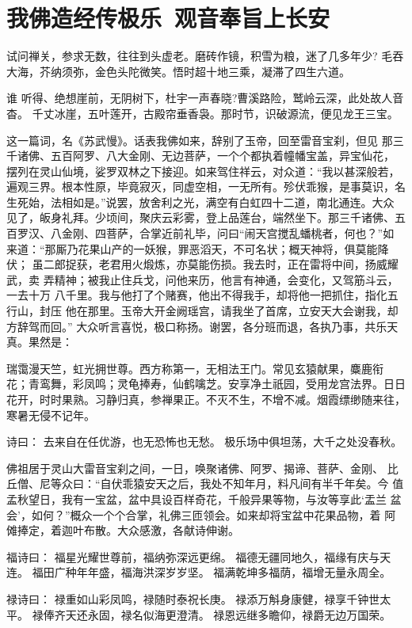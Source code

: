 \chapter{我佛造经传极乐~观音奉旨上长安}

试问禅关，参求无数，往往到头虚老。磨砖作镜，积雪为粮，迷了几多年少?
毛吞大海，芥纳须弥，金色头陀微笑。悟时超十地三乘，凝滞了四生六道。

谁
听得、绝想崖前，无阴树下，杜宇一声春晓?曹溪路险，鹫岭云深，此处故人音杳。
千丈冰崖，五叶莲开，古殿帘垂香袅。那时节，识破源流，便见龙王三宝。

这一篇词，名《苏武慢》。话表我佛如来，辞别了玉帝，回至雷音宝刹，但见
那三千诸佛、五百阿罗、八大金刚、无边菩萨，一个个都执着幢幡宝盖，异宝仙花，
摆列在灵山仙境，娑罗双林之下接迎。如来驾住祥云，对众道：“我以甚深般若，
遍观三界。根本性原，毕竟寂灭，同虚空相，一无所有。殄伏乖猴，是事莫识，名
生死始，法相如是。”说罢，放舍利之光，满空有白虹四十二道，南北通连。大众
见了，皈身礼拜。少顷间，聚庆云彩雾，登上品莲台，端然坐下。那三千诸佛、五
百罗汉、八金刚、四菩萨，合掌近前礼毕，问曰“闹天宫搅乱蟠桃者，何也？”如
来道：“那厮乃花果山产的一妖猴，罪恶滔天，不可名状；概天神将，俱莫能降伏；
虽二郎捉获，老君用火煅炼，亦莫能伤损。我去时，正在雷将中间，扬威耀武，卖
弄精神；被我止住兵戈，问他来历，他言有神通，会变化，又驾筋斗云，一去十万
八千里。我与他打了个赌赛，他出不得我手，却将他一把抓住，指化五行山，封压
他在那里。玉帝大开金阙瑶宫，请我坐了首席，立安天大会谢我，却方辞驾而回。”
大众听言喜悦，极口称扬。谢罢，各分班而退，各执乃事，共乐天真。果然是：

瑞霭漫天竺，虹光拥世尊。西方称第一，无相法王门。常见玄猿献果，麋鹿衔
花；青鸾舞，彩凤鸣；灵龟捧寿，仙鹤噙芝。安享净土祇园，受用龙宫法界。日日
花开，时时果熟。习静归真，参禅果正。不灭不生，不增不减。烟霞缥缈随来往，
寒暑无侵不记年。

诗曰：
去来自在任优游，也无恐怖也无愁。
极乐场中俱坦荡，大千之处没春秋。

佛祖居于灵山大雷音宝刹之间，一日，唤聚诸佛、阿罗、揭谛、菩萨、金刚、
比丘僧、尼等众曰：“自伏乖猿安天之后，我处不知年月，料凡间有半千年矣。今
值孟秋望日，我有一宝盆，盆中具设百样奇花，千般异果等物，与汝等享此‘盂兰
盆会’，如何？”概众一个个合掌，礼佛三匝领会。如来却将宝盆中花果品物，着
阿傩捧定，着迦叶布散。大众感激，各献诗伸谢。

福诗曰：
福星光耀世尊前，福纳弥深远更绵。
福德无疆同地久，福缘有庆与天连。
福田广种年年盛，福海洪深岁岁坚。
福满乾坤多福荫，福增无量永周全。

禄诗曰：
禄重如山彩凤鸣，禄随时泰祝长庚。
禄添万斛身康健，禄享千钟世太平。
禄俸齐天还永固，禄名似海更澄清。
禄恩远继多瞻仰，禄爵无边万国荣。

